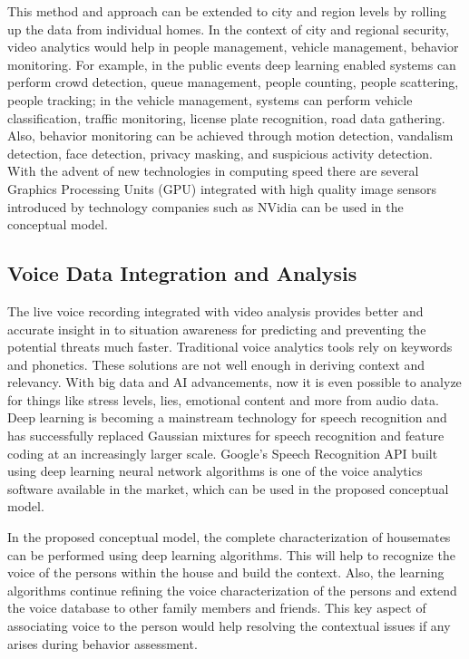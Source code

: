 \documentclass[sigconf]{acmart}
\begin{document}
This method and approach can be extended to city and region levels by rolling up the data from individual homes. In the context of city and regional security, video analytics would help in people management, vehicle management, behavior monitoring. For example, in the public events deep learning enabled systems can  perform crowd detection, queue management, people counting, people scattering, people tracking; in the vehicle management, systems can perform vehicle classification, traffic monitoring, license plate recognition, road data gathering. Also, behavior monitoring can be achieved through motion detection, vandalism detection, face detection, privacy masking, and suspicious activity detection. With the advent of new technologies in computing speed there are several Graphics Processing Units (GPU) integrated with high quality image sensors  introduced by technology companies such as NVidia can be used in the conceptual model.

\subsection{Voice Data Integration and Analysis}
The live voice recording integrated with video analysis provides better and accurate insight in to situation awareness for predicting and preventing the potential threats much faster. Traditional voice analytics tools rely on keywords and phonetics. These solutions are not well enough in deriving context and relevancy. With big data and AI advancements, now it is even possible to analyze for things like stress levels, lies, emotional content and more from audio data. Deep learning is becoming a mainstream technology for speech recognition and has successfully replaced Gaussian mixtures for speech recognition and feature coding at an increasingly larger scale. Google's Speech Recognition API built using deep learning neural network algorithms is one of the voice analytics software available in the market, which can be used in the proposed conceptual model.

In the proposed conceptual model, the complete characterization of housemates can be performed using deep learning algorithms. This will help to recognize the voice of the persons within the house and build the context. Also, the learning algorithms continue refining the voice characterization of the persons and extend the voice database to other family members and friends. This key aspect of associating voice to the person would help resolving the contextual issues if any arises during behavior assessment.
\end{document}
